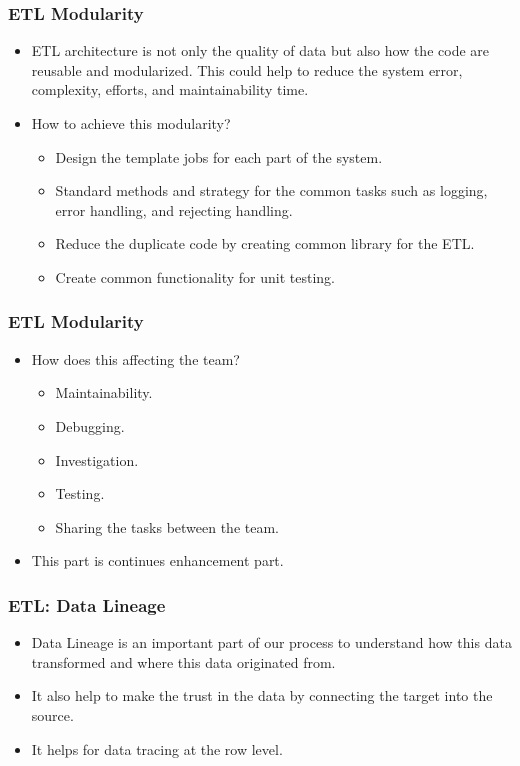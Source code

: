 \begin{frame}
	\frametitle{ETL Modularity}
	\begin{itemize}[<+->]
		\item ETL architecture is not only the quality of data but also how the code are reusable and modularized. This could help to reduce the system error, complexity, efforts, and maintainability time. 
		\item How to achieve this modularity?
		\begin{itemize}[<+->]
			\item Design the template jobs for each part of the system. 
			\item Standard methods and strategy for the common tasks such as logging, error handling, and rejecting handling.
			\item  Reduce the duplicate code by creating common library for the ETL.
			\item  Create common functionality for unit testing.
						
		\end{itemize}
	\end{itemize}
\end{frame}

\begin{frame}
	\frametitle{ETL Modularity}
	\begin{itemize}[<+->]
		\item How does this affecting the team?
		\begin{itemize}[<+->]
			\item Maintainability.
			\item Debugging.
			\item Investigation.
			\item Testing.
			\item Sharing the tasks between the team.
			
		\end{itemize}
		\item This part is continues enhancement part. 
	\end{itemize}
\end{frame}
\begin{frame}
	\frametitle{ETL: Data Lineage}
	\begin{itemize}[<+->]
		\item Data Lineage is an important part of our process to understand how this data transformed and where this data originated from.
		\item It also help to make the trust in the data by connecting the target into the source.
		\item It helps for data tracing at the row level.
	\end{itemize}
\end{frame}

